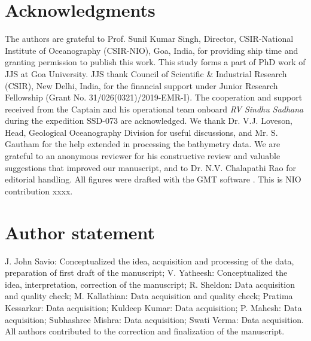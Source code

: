\documentclass[twocolumn]{article}
\begin{document}

\section*{Acknowledgments}

The authors are grateful to Prof. Sunil Kumar Singh, Director, CSIR-National Institute of Oceanography (CSIR-NIO), Goa, India, for providing ship time and granting permission to publish this work. This study forms a part of PhD work of JJS at Goa University. JJS thank Council of Scientific \& Industrial Research (CSIR), New Delhi, India, for the financial support under Junior Research Fellowship (Grant No. 31/026(0321)/2019-EMR-I). The cooperation and support received from the Captain and his operational team onboard \textit{RV Sindhu Sadhana} during the expedition SSD-073 are acknowledged. We thank Dr. V.J. Loveson, Head, Geological Oceanography Division for useful discussions, and Mr. S. Gautham for the help extended in processing the bathymetry data. We are grateful to an anonymous reviewer for his constructive review and valuable suggestions that improved our manuscript, and to Dr. N.V. Chalapathi Rao for editorial handling. All figures were drafted with the GMT software  \citep{Wessel2019}. This is NIO contribution xxxx.



\section*{Author statement}

J. John Savio: Conceptualized the idea, acquisition and processing of the data, preparation of first draft of the manuscript; V. Yatheesh: Conceptualized the idea, interpretation, correction of the manuscript; R. Sheldon: Data acquisition and quality check; M. Kallathian: Data acquisition and quality check; Pratima Kessarkar: Data acquisition; Kuldeep Kumar: Data acquisition; P. Mahesh: Data acquisition; Subhashree Mishra: Data acquisition; Swati Verma: Data acquisition. All authors contributed to the correction and finalization of the manuscript.





\appendix
\end{document}
